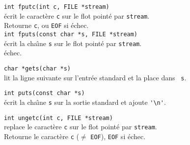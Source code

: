 \begin{frame}
{\tt int fputc(int c, FILE *stream)}\\
\'ecrit le caract\`ere {\tt c} sur le flot point\'e par {\tt stream}.\\
Retourne {\tt c}, ou {\tt EOF} si \'echec.\\

{\tt int fputs(const char *s, FILE *stream)}\\
\'ecrit la cha\^\i{}ne {\tt s} sur le flot point\'e par {\tt stream}.\\
\'echec.

{\tt char *gets(char *s)}\\
lit la ligne suivante sur l'entr\'ee standard et la place dans {\tt
  s}.

{\tt int puts(const char *s)}\\
\'ecrit la cha\^\i{}ne {\tt s} sur la sortie standard et ajoute \verb?'\n'?.

{\tt int ungetc(int c, FILE *stream)}\\
replace le caract\`ere {\tt c} sur le flot point\'e par {\tt stream}.\\
Retourne le caract\`ere {\tt c} ($\neq$ {\tt EOF}), {\tt EOF} si
\'echec.


\end{frame}



